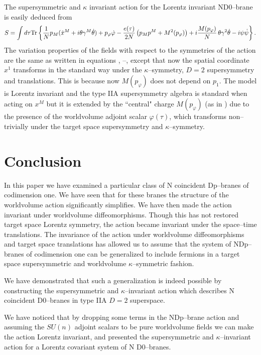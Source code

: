 \documentclass[a4paper,12pt]{article}
\begin{document}
The supersymmetric and $\kappa$ invariant action for the Lorentz
invariant ND0--brane is easily deduced from 
\begin{equation}\label{36}
S=\int d\tau {\rm Tr}\left\{{1\over N}p_M(\dot
x^M+i\theta\gamma^M\dot\theta)+p_\varphi\dot\varphi-{{e(\tau)}\over
2N}\left(p_Mp^M+M^2(p_\varphi)\right) +i{M(p_\varphi)\over N}\,
\theta\gamma^2\dot\theta-i\psi\dot\psi \right\}.
\end{equation}
The variation properties of the  fields with respect to the
symmetries of the action  are the same as  written in
equations , --, except that now the
spatial coordinate $x^1$ transforms in the standard way
under the $\kappa$--symmetry, $D=2$ supersymmetry
and translations. This is because now
$M(p_\varphi)$ does not depend on $p_1$. The model is Lorentz
invariant and the type IIA supersymmetry algebra is standard when
acting on $x^M$ but it is extended by the ``central" charge
$M(p_\varphi)$ (as in ) due to the presence of the worldvolume
adjoint scalar $\varphi(\tau)$, which transforms non--trivially
under the target space supersymmetry and $\kappa$--symmetry.

\section{Conclusion}

In this paper we have examined a particular class of N coincident
Dp--branes of codimension one. We have seen that for these branes
the structure of the worldvolume action significantly simplifies.
We have then made the action invariant under worldvolume
diffeomorphisms. Though this has not restored target space Lorentz
symmetry, the action became invariant under the space--time
translations. The invariance of the action under worldvolume
diffeomorphisms and target space translations has allowed us to
assume that the system of NDp--branes of codimension one can be
generalized to include fermions in a target space supersymmetric
and worldvolume
$\kappa$--symmetric fashion.

We have demonstrated that such a generalization is indeed possible
by constructing the supersymmetric and
$\kappa$--invariant action which describes N coincident D0--branes
in type IIA $D=2$ superspace.

We have noticed that by dropping some terms in the NDp--brane
action and assuming the $SU(n)$ adjoint scalars to be pure
worldvolume fields we can make the action Lorentz invariant, and
presented the supersymmetric and $\kappa$--invariant action for a
Lorentz covariant system of N D0--branes.
\end{document}
